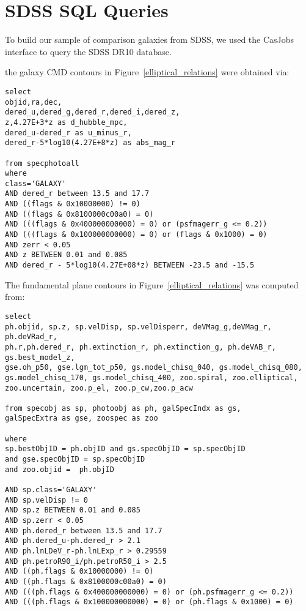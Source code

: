 \documentclass[12pt,preprint]{aastex}
\begin{document}
\clearpage

\appendix
\section{SDSS SQL Queries} \label{SQL}
To build our sample of comparison galaxies from SDSS, we used the CasJobs interface to query the SDSS DR10 database.


the galaxy CMD contours in Figure~\ref{elliptical_relations} were obtained via:
\begin{verbatim}
select 
objid,ra,dec,
dered_u,dered_g,dered_r,dered_i,dered_z,
z,4.27E+3*z as d_hubble_mpc,
dered_u-dered_r as u_minus_r,
dered_r-5*log10(4.27E+8*z) as abs_mag_r 

from specphotoall
where
class='GALAXY'
AND dered_r between 13.5 and 17.7
AND ((flags & 0x10000000) != 0)
AND ((flags & 0x8100000c00a0) = 0)
AND (((flags & 0x400000000000) = 0) or (psfmagerr_g <= 0.2))
AND (((flags & 0x100000000000) = 0) or (flags & 0x1000) = 0)
AND zerr < 0.05
AND z BETWEEN 0.01 and 0.085
AND dered_r - 5*log10(4.27E+08*z) BETWEEN -23.5 and -15.5
\end{verbatim}


The fundamental plane contours in Figure~\ref{elliptical_relations} was computed from:
\begin{verbatim}
select
ph.objid, sp.z, sp.velDisp, sp.velDisperr, deVMag_g,deVMag_r, ph.deVRad_r, 
ph.r,ph.dered_r, ph.extinction_r, ph.extinction_g, ph.deVAB_r,  gs.best_model_z, 
gse.oh_p50, gse.lgm_tot_p50, gs.model_chisq_040, gs.model_chisq_080, 
gs.model_chisq_170, gs.model_chisq_400, zoo.spiral, zoo.elliptical, 
zoo.uncertain, zoo.p_el, zoo.p_cw,zoo.p_acw 

from specobj as sp, photoobj as ph, galSpecIndx as gs, 
galSpecExtra as gse, zoospec as zoo

where
sp.bestObjID = ph.objID and gs.specObjID = sp.specObjID 
and gse.specObjID = sp.specObjID 
and zoo.objid =  ph.objID 

AND sp.class='GALAXY'
AND sp.velDisp != 0
AND sp.z BETWEEN 0.01 and 0.085
AND sp.zerr < 0.05
AND ph.dered_r between 13.5 and 17.7
AND ph.dered_u-ph.dered_r > 2.1
AND ph.lnLDeV_r-ph.lnLExp_r > 0.29559
AND ph.petroR90_i/ph.petroR50_i > 2.5
AND ((ph.flags & 0x10000000) != 0)
AND ((ph.flags & 0x8100000c00a0) = 0)
AND (((ph.flags & 0x400000000000) = 0) or (ph.psfmagerr_g <= 0.2))
AND (((ph.flags & 0x100000000000) = 0) or (ph.flags & 0x1000) = 0)
\end{verbatim}
\end{document}
